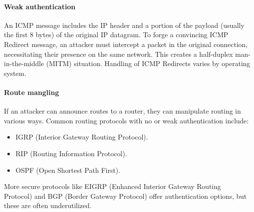 \paragraph*{Weak authentication}
An ICMP message includes the IP header and a portion of the payload (usually the first 8 bytes) of the original IP datagram. 
To forge a convincing ICMP Redirect message, an attacker must intercept a packet in the original connection, necessitating their presence on the same network. 
This creates a half-duplex man-in-the-middle (MITM) situation.
Handling of ICMP Redirects varies by operating system.

\paragraph*{Route mangling}
If an attacker can announce routes to a router, they can manipulate routing in various ways. 
Common routing protocols with no or weak authentication include:
\begin{itemize}
    \item IGRP (Interior Gateway Routing Protocol).
    \item RIP (Routing Information Protocol).
    \item OSPF (Open Shortest Path First).
\end{itemize}
More secure protocols like EIGRP (Enhanced Interior Gateway Routing Protocol) and BGP (Border Gateway Protocol) offer authentication options, but these are often underutilized.